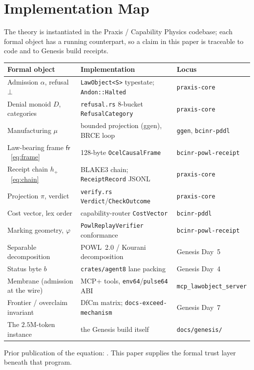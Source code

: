 \documentclass[11pt,oneside]{book}
\theoremstyle{definition}
\theoremstyle{plain}
\theoremstyle{remark}
\newcommand{\Proj}{\pi}                        %
\newcommand{\muop}{\mu}                        %
\newcommand{\adm}{\alpha}                      %
\newcommand{\Rfsl}{\bot}                       %
\newcommand{\Fitness}{\varphi}
\begin{document}
\chapter{Implementation Map}
The theory is instantiated in the Praxis / Capability Physics codebase; each formal object has
a running counterpart, so a claim in this paper is traceable to code and to Genesis build
receipts.
\begin{center}
\begin{tabular}{lll}
\toprule
Formal object & Implementation & Locus\\
\midrule
Admission $\adm$, refusal $\Rfsl$ & \texttt{LawObject<S>} typestate; \texttt{Andon::Halted} & \texttt{praxis-core}\\
Denial monoid $D$, categories & \texttt{refusal.rs} 8-bucket \texttt{RefusalCategory} & \texttt{praxis-core}\\
Manufacturing $\muop$ & bounded projection (ggen), BRCE loop & \texttt{ggen}, \texttt{bcinr-pddl}\\
Law-bearing frame $\mathsf{fr}$~\eqref{eq:frame} & 128-byte \texttt{OcelCausalFrame} & \texttt{bcinr-powl-receipt}\\
Receipt chain $h_+$~\eqref{eq:chain} & BLAKE3 chain; \texttt{ReceiptRecord} JSONL & \texttt{praxis-core}\\
Projection $\Proj$, verdict & \texttt{verify.rs} \texttt{Verdict}/\texttt{CheckOutcome} & \texttt{praxis-core}\\
Cost vector, lex order & capability-router \texttt{CostVector} & \texttt{bcinr-pddl}\\
Marking geometry, $\Fitness$ & \texttt{PowlReplayVerifier} conformance & \texttt{bcinr-powl-receipt}\\
Separable decomposition & POWL~2.0 / Kourani decomposition & Genesis Day~5\\
Status byte $b$ & \texttt{crates/agent8} lane packing & Genesis Day~4\\
Membrane (admission at the wire) & MCP+ tools, \texttt{env64}/\texttt{pulse64} ABI & \texttt{mcp\_lawobject\_server}\\
Frontier / overclaim invariant & DfCm matrix; \texttt{docs-exceed-mechanism} & Genesis Day~7\\
The $2.5$M-token instance & the Genesis build itself & \texttt{docs/genesis/}\\
\bottomrule
\end{tabular}
\end{center}
Prior publication of the equation: \cite{chatman2025}. This paper supplies the formal trust
layer beneath that program.
\end{document}
